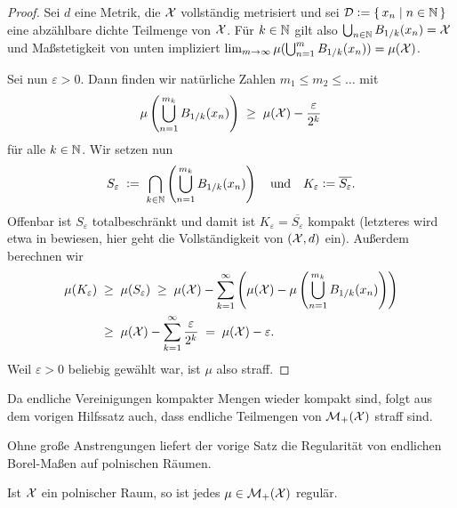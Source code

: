 \documentclass[../thesis/thesis.tex]{subfiles}
\begin{document}
	\begin{proof}
		Sei $d$ eine Metrik, die $\mathcal{X}$ vollständig metrisiert und sei 
		$\mathcal{D} \vcentcolon = \left\{\, x_n \; \middle| \; n \in \mathbb{N} \,\right\}$ eine abzählbare dichte Teilmenge von $\mathcal{X}$. 
		Für $k \in \mathbb{N}$ gilt also $\bigcup_{n \in \mathbb{N}} B_{1/k}(x_n) = \mathcal{X}$ und Maßstetigkeit 
		von unten impliziert 
		$\lim_{m \to \infty} \mu(\bigcup_{n=1}^{m} B_{1/k}(x_n)) = \mu(\mathcal{X})$.
		
		Sei nun $\varepsilon > 0$. Dann finden wir natürliche Zahlen $m_1 \leq m_2 \leq \dots$ mit
		\[ \mu\left( \bigcup_{n=1}^{m_k} B_{1/k}(x_n) \right) \; \geq \; \mu(\mathcal{X}) - \frac{\varepsilon}{2^k} \]
		für alle $k \in \mathbb{N}$. Wir setzen nun
		\[ S_\varepsilon 
		\; \vcentcolon = \; \bigcap_{k \in \mathbb{N}} \left( \bigcup_{n=1}^{m_k} B_{1/k}(x_n) \right) 
		\quad \text{und} \quad K_\varepsilon \vcentcolon = \overline{S_\varepsilon} \text{.} \]
		Offenbar ist $S_\varepsilon$ totalbeschränkt und damit ist $K_\varepsilon = \overline{S_\varepsilon}$ 
		kompakt (letzteres wird etwa in \cite[Theorem 2.3.8]{Simon.2015} bewiesen, 
		hier geht die Vollständigkeit von $(\mathcal{X}, d)$ ein).
		Außerdem berechnen wir
		\begin{align*}
			\mu(K_\varepsilon) \; &\geq \; \mu(S_\varepsilon) 
			\; \geq \; \mu(\mathcal{X}) - \sum_{k=1}^{\infty} \left( \mu(\mathcal{X}) - \mu\left( \bigcup_{n=1}^{m_k} B_{1/k}(x_n) \right) \right) \\
			\; &\geq \; \mu(\mathcal{X}) - \sum_{k=1}^{\infty} \frac{\varepsilon}{2^k} \; = \; \mu(\mathcal{X}) - \varepsilon \text{.}
		\end{align*} 
		Weil $\varepsilon > 0$ beliebig gewählt war, ist $\mu$ also straff.
	\end{proof}

	\begin{Bemerkung}
		Da endliche Vereinigungen kompakter Mengen wieder kompakt sind, folgt aus dem vorigen Hilfssatz auch, dass endliche Teilmengen von $\mathcal{M}_{+}(\mathcal{X})$ straff sind.
	\end{Bemerkung}
	
	Ohne große Anstrengungen liefert der vorige Satz die Regularität von endlichen Borel-Maßen auf polnischen Räumen.
	
	\begin{Folgerung}
		\label{folgerung:polnischer_raum_reguläre_maße}
		Ist $\mathcal{X}$ ein polnischer Raum, so ist jedes $\mu \in \mathcal{M}_{+}(\mathcal{X})$ regulär.
	\end{Folgerung}
	
\end{document}
